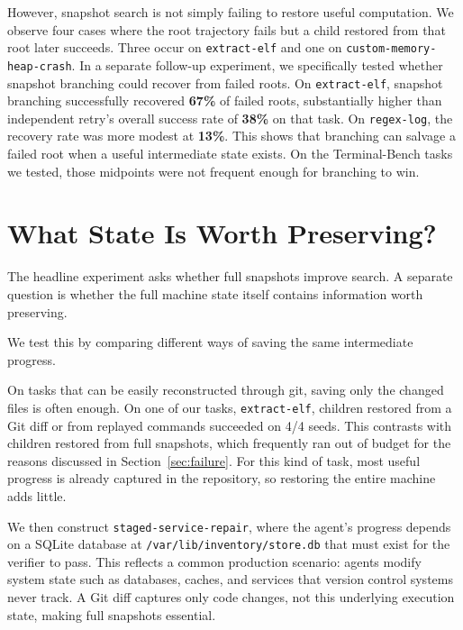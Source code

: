 \documentclass{article}
\begin{document}
However, snapshot search is not simply failing to restore useful computation. We observe four cases where the root trajectory fails but a child restored from that root later succeeds. Three occur on \texttt{extract-elf} and one on \texttt{custom-memory-heap-crash}. In a separate follow-up experiment, we specifically tested whether snapshot branching could recover from failed roots. On \texttt{extract-elf}, snapshot branching successfully recovered \textbf{67\%} of failed roots, substantially higher than independent retry's overall success rate of \textbf{38\%} on that task. On \texttt{regex-log}, the recovery rate was more modest at \textbf{13\%}. This shows that branching can salvage a failed root when a useful intermediate state exists. On the Terminal-Bench tasks we tested, those midpoints were not frequent enough for branching to win.

\section{What State Is Worth Preserving?}
\label{sec:state}

The headline experiment asks whether full snapshots improve search. A separate question is whether the full machine state itself contains information worth preserving.

We test this by comparing different ways of saving the same intermediate progress.

On tasks that can be easily reconstructed through git, saving only the changed files is often enough. On one of our tasks, \texttt{extract-elf}, children restored from a Git diff or from replayed commands succeeded on 4/4 seeds. This contrasts with children restored from full snapshots, which frequently ran out of budget for the reasons discussed in Section~\ref{sec:failure}. For this kind of task, most useful progress is already captured in the repository, so restoring the entire machine adds little.

We then construct \texttt{staged-service-repair}, where the agent's progress depends on a SQLite database at \texttt{/var/lib/inventory/store.db} that must exist for the verifier to pass. This reflects a common production scenario: agents modify system state such as databases, caches, and services that version control systems never track. A Git diff captures only code changes, not this underlying execution state, making full snapshots essential.
\end{document}
